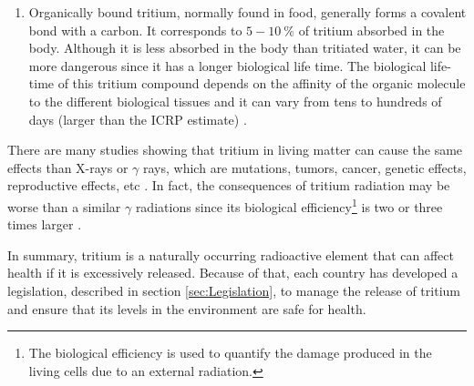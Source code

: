 \begin{enumerate}
\item{} Organically bound tritium, normally found in food, generally forms a covalent bond with a carbon. It corresponds to $5-10~\%$ of tritium absorbed in the body. Although it is less absorbed in the body than tritiated water, it can be more dangerous since it has a longer biological life time. The biological life-time of this tritium compound depends on the affinity of the organic molecule to the different biological tissues and it can vary from tens to hundreds of days (larger than the ICRP estimate) \cite{FranceTritiumEnvironment, EstimationTritiumDosi, EstimationTritiumDosiRats, EstimationTritiumDosiKangarooRats}.
\end{enumerate}

There are many studies showing that tritium in living matter can cause the same effects than X-rays or $\gamma$ rays, which are mutations, tumors, cancer, genetic effects, reproductive effects, etc \cite{StraumeTritiumHazard, RytoemaaTritiumHazard}. In fact, the consequences of tritium radiation may be worse than a similar $\gamma$ radiations since its biological efficiency\footnote{The biological efficiency is used to quantify the damage produced in the living cells due to an external radiation.} is two or three times larger \cite{StraumeTritiumHazard}.

In summary, tritium is a naturally occurring radioactive element that can affect health if it is excessively released. Because of that, each country has developed a legislation, described in section \ref{sec:Legislation}, to manage the release of tritium and ensure that its levels in the environment are safe for health.




